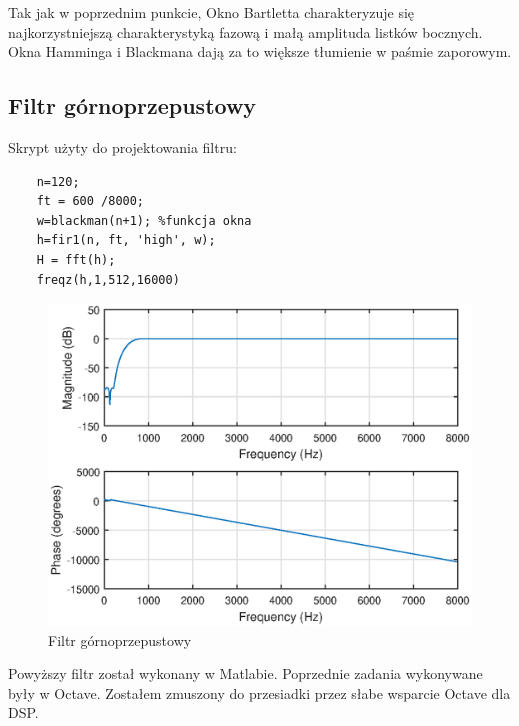 \documentclass[12pt,titlepage]{report}
\begin{document}
Tak jak w poprzednim punkcie, Okno Bartletta charakteryzuje się najkorzystniejszą charakterystyką fazową i małą amplituda listków bocznych. Okna Hamminga i Blackmana dają za to większe tłumienie w paśmie zaporowym.
\newpage

\subsection{Filtr górnoprzepustowy}
Skrypt użyty do projektowania filtru:
{
	\tiny
	\begin{verbatim}
	n=120;
	ft = 600 /8000;
	w=blackman(n+1); %funkcja okna
	h=fir1(n, ft, 'high', w);
	H = fft(h);
	freqz(h,1,512,16000)
	\end{verbatim}
}
\begin{figure}[!h]
	\centering
	\includegraphics[scale=0.7]{../cw33_output}
	\caption{Filtr górnoprzepustowy}
\end{figure}
Powyższy filtr został wykonany w Matlabie. Poprzednie zadania wykonywane były w Octave. Zostałem zmuszony do przesiadki przez słabe wsparcie Octave dla DSP.
\newpage
\end{document}
